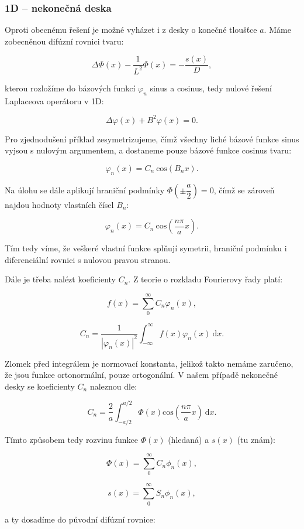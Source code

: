 \subsubsection{1D -- nekonečná deska}

Oproti obecnému řešení je možné vyházet i z desky o konečné tloušťce $a$. Máme zobecněnou difúzní rovnici tvaru:

$$ \Delta \Phi(x) - \dfrac{1}{L^2} \Phi(x) = - \dfrac{s(x)}{D}, $$

kterou rozložíme do bázových funkcí $\varphi_n$ sinus a cosinus, tedy nulové řešení Laplaceova operátoru v 1D:

$$ \Delta \varphi(x) + B^2 \varphi(x) = 0. $$

Pro zjednodušení příklad zesymetrizujeme, čímž všechny liché bázové funkce sinus vyjsou s nulovým argumentem, a dostaneme pouze bázové funkce cosinus tvaru:

$$ \varphi_n(x) = C_n \: \text{cos} \left(B_n x\right). $$

Na úlohu se dále aplikují hraniční podmínky $\Phi\left(\pm \dfrac{a}{2}\right) = 0$, čímž se zároveň najdou hodnoty vlastních čísel $B_n$:

$$ \varphi_n(x) = C_n \: \text{cos} \left(\dfrac{n \pi}{a} x\right). $$

Tím tedy víme, že veškeré vlastní funkce splňují symetrii, hraniční podmínku i diferenciální rovnici s nulovou pravou stranou.

Dále je třeba nalézt koeficienty $C_n$. Z teorie o rozkladu Fourierovy řady platí:

$$ f(x) = \sum_{0}^{\infty} C_n \varphi_n(x), $$

$$ C_n = \dfrac{1}{|\varphi_n(x)|^2} \int_{-\infty}^{\infty} f(x) \varphi_n(x) \: \text{d} x. $$

Zlomek před integrálem je normovací konstanta, jelikož takto nemáme zaručeno, že jsou funkce ortonormální, pouze ortogonální. V našem případě nekonečné desky se koeficienty $C_n$ naleznou dle:

$$ C_n = \dfrac{2}{a} \int_{-a/2}^{a/2} \Phi(x) \text{cos} \left(\dfrac{n \pi}{a} x\right) \: \text{d} x. $$

Tímto způsobem tedy rozvinu funkce $\Phi(x)$ (hledaná) a $s(x)$ (tu znám):

$$ \Phi(x) = \sum_{0}^{\infty} C_n \phi_n(x), $$

$$ s(x) = \sum_{0}^{\infty} S_n \phi_n(x), $$

a ty dosadíme do původní difúzní rovnice:


